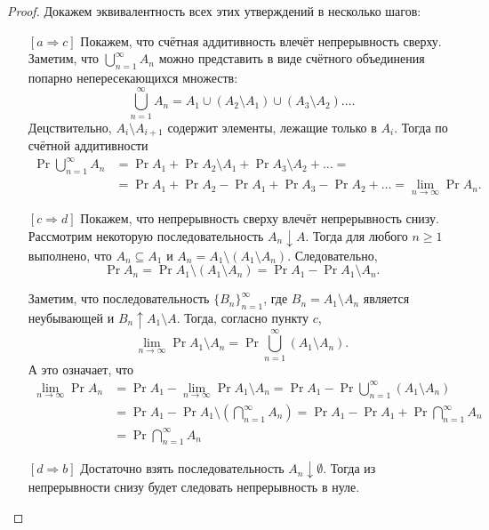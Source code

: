 \begin{proof}
	Докажем эквивалентность всех этих утверждений в несколько шагов:
	
	\begin{itemize}
		\item[{\([a \Rightarrow c]\)}] Покажем, что счётная аддитивность влечёт непрерывность сверху. Заметим, что \(\bigcup_{n = 1}^{\infty} A_n\) можно представить в виде счётного объединения попарно непересекающихся множеств:
		\[
		\bigcup\limits_{n = 1}^{\infty} A_n = A_1 \cup (A_2\setminus A_1) \cup (A_3\setminus A_2)\ldots.
		\]
		Децствительно, \(A_i \setminus A_{i + 1}\) содержит элементы, лежащие только в \(A_i\). Тогда по счётной аддитивности
		\begin{align}
			\Pr{\bigcup\limits_{n = 1}^{\infty} A_n} &=
			\Pr{A_1} + \Pr{A_2\setminus A_1} + \Pr{A_3\setminus A_2} + \ldots =\\
			&= \Pr{A_1} + \Pr{A_2} - \Pr{A_1} + \Pr{A_3} -\Pr{A_2} + \ldots =
			\lim\limits_{n \to \infty} \Pr{A_n}.
		\end{align}
		
		\item[{\([c \Rightarrow d]\)}] Покажем, что непрерывность сверху влечёт непрерывность снизу. Рассмотрим некоторую последовательность \(A_n \downarrow
		A\). Тогда для любого \(n \geq 1\) выполнено, что \(A_n \subseteq A_1\) и \(A_n = A_1 \setminus (A_1 \setminus A_n)\). Следовательно,
		\[
		\Pr{A_n} = \Pr{A_1 \setminus(A_1\setminus A_n)} = \Pr{A_1} - \Pr{A_1\setminus A_n}.
		\]
		
		Заметим, что последовательность \(\{B_n\}_{n = 1}^{\infty}\), где \(B_n = A_1 \setminus A_n\) является неубывающей и \(B_n \uparrow A_1 \setminus A\). Тогда, согласно пункту \(c\),
		\[
		\lim\limits_{n \to \infty}\Pr{A_1\setminus A_n} = \Pr{\bigcup\limits_{n=1}^{\infty}(A_1\setminus A_n)}.
		\]
		А это означает, что
		\begin{align}
			\lim\limits_{n \to \infty} \Pr{A_n} &= \Pr{A_1} - \lim\limits_{n \to \infty}\Pr{A_1\setminus A_n} = \Pr{A_1} - \Pr{\bigcup\limits_{n=1}^{\infty}(A_1\setminus A_n)} \\
			&= \Pr{A_1} - \Pr{A_1 \setminus \left(\bigcap\limits_{n=1}^{\infty} A_n\right)} = \Pr{A_1} - \Pr{A_1} + \Pr{\bigcap\limits_{n=1}^{\infty} A_n} \\
			&= \Pr{\bigcap\limits_{n=1}^{\infty} A_n}
		\end{align}
		
		\item[{\([d \Rightarrow b]\)}] Достаточно взять последовательность \(A_n \downarrow \emptyset\). Тогда из непрерывности снизу будет следовать непрерывность в нуле.
		

\end{itemize}
\end{proof}

